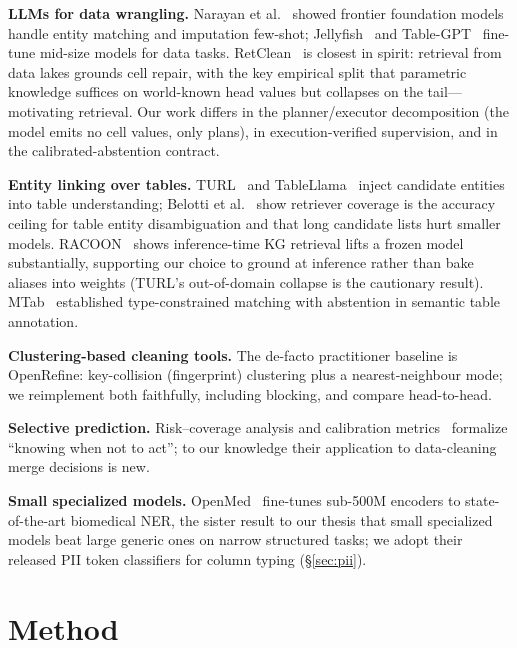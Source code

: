 \documentclass[11pt]{article}
\begin{document}
\textbf{LLMs for data wrangling.} Narayan et al.~\cite{wrangle} showed frontier
foundation models handle entity matching and imputation few-shot;
Jellyfish~\cite{jellyfish} and Table-GPT~\cite{tablegpt} fine-tune mid-size models for
data tasks. RetClean~\cite{retclean} is closest in spirit: retrieval from data lakes
grounds cell repair, with the key empirical split that parametric knowledge suffices on
world-known head values but collapses on the tail---motivating retrieval. Our work
differs in the planner/executor decomposition (the model emits no cell values, only
plans), in execution-verified supervision, and in the calibrated-abstention contract.

\textbf{Entity linking over tables.} TURL~\cite{turl} and TableLlama~\cite{tablellama}
inject candidate entities into table understanding; Belotti et al.~\cite{belotti}
show retriever coverage is the accuracy ceiling for table entity disambiguation and that
long candidate lists hurt smaller models. RACOON~\cite{racoon} shows inference-time KG
retrieval lifts a frozen model substantially, supporting our choice to ground at
inference rather than bake aliases into weights (TURL's out-of-domain collapse is the
cautionary result). MTab~\cite{mtab} established type-constrained matching with
abstention in semantic table annotation.

\textbf{Clustering-based cleaning tools.} The de-facto practitioner baseline is
OpenRefine: key-collision (fingerprint) clustering plus a nearest-neighbour mode; we
reimplement both faithfully, including blocking, and compare head-to-head.

\textbf{Selective prediction.} Risk--coverage analysis and calibration
metrics~\cite{selective} formalize ``knowing when not to act''; to our knowledge their
application to data-cleaning merge decisions is new.

\textbf{Small specialized models.} OpenMed~\cite{openmed} fine-tunes sub-500M encoders
to state-of-the-art biomedical NER, the sister result to our thesis that small
specialized models beat large generic ones on narrow structured tasks; we adopt their
released PII token classifiers for column typing (\S\ref{sec:pii}).

\section{Method}
\label{sec:method}
\end{document}
